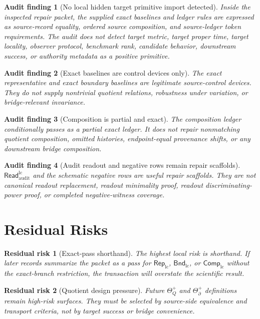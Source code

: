 \documentclass[11pt]{article}
\newcommand{\ReadAudit}{\mathsf{Read}_{\mathrm{audit}}^{\mathrm{lc}}}
\newcommand{\RepLC}{\mathsf{Rep}_{\mathrm{lc}}}
\newcommand{\BndLC}{\mathsf{Bnd}_{\mathrm{lc}}}
\newcommand{\CompLC}{\mathsf{Comp}_{\mathrm{lc}}}
\newtheorem{auditfinding}{Audit finding}
\newtheorem{residualrisk}{Residual risk}
\begin{document}
\begin{auditfinding}[No local hidden target primitive import detected]
Inside the inspected repair packet, the supplied exact baselines and
ledger rules are expressed as source-record equality, ordered source
composition, and source-ledger token requirements. The audit does not
detect target metric, target proper time, target locality, observer
protocol, benchmark rank, candidate behavior, downstream success, or
authority metadata as a positive primitive.
\end{auditfinding}

\begin{auditfinding}[Exact baselines are control devices only]
The exact representative and exact boundary baselines are legitimate
source-control devices. They do not supply nontrivial quotient
relations, robustness under variation, or bridge-relevant invariance.
\end{auditfinding}

\begin{auditfinding}[Composition is partial and exact]
The composition ledger conditionally passes as a partial exact ledger.
It does not repair nonmatching quotient composition, omitted histories,
endpoint-equal provenance shifts, or any downstream bridge
composition.
\end{auditfinding}

\begin{auditfinding}[Audit readout and negative rows remain repair scaffolds]
\(\ReadAudit\) and the schematic negative rows are useful repair
scaffolds. They are not canonical readout replacement, readout
minimality proof, readout discriminating-power proof, or completed
negative-witness coverage.
\end{auditfinding}

\section{Residual Risks}

\begin{residualrisk}[Exact-pass shorthand]
The highest local risk is shorthand. If later records summarize the
packet as a pass for \(\RepLC\), \(\BndLC\), or \(\CompLC\) without
the exact-branch restriction, the transaction will overstate the
scientific result.
\end{residualrisk}

\begin{residualrisk}[Quotient design pressure]
Future \(\Theta_Q^{+}\) and \(\Theta_{\partial}^{+}\) definitions
remain high-risk surfaces. They must be selected by source-side
equivalence and transport criteria, not by target success or bridge
convenience.
\end{residualrisk}
\end{document}
